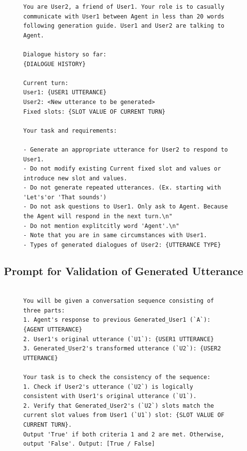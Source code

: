 \begin{figure}[h]
    \centering
\begin{lstlisting}
You are User2, a friend of User1. Your role is to casually communicate with User1 between Agent in less than 20 words following generation guide. User1 and User2 are talking to Agent.

Dialogue history so far:
{DIALOGUE HISTORY}

Current turn:
User1: {USER1 UTTERANCE}
User2: <New utterance to be generated>
Fixed slots: {SLOT VALUE OF CURRENT TURN}

Your task and requirements:

- Generate an appropriate utterance for User2 to respond to User1.
- Do not modify existing Current fixed slot and values or introduce new slot and values.
- Do not generate repeated utterances. (Ex. starting with 'Let's'or 'That sounds')
- Do not ask questions to User1. Only ask to Agent. Because the Agent will respond in the next turn.\n"
- Do not mention explitcitly word 'Agent'.\n"
- Note that you are in same circumstances with User1.
- Types of generated dialogues of User2: {UTTERANCE TYPE}

\end{lstlisting}
\end{figure}

\subsection{Prompt for Validation of Generated Utterance}
\label{app:prompt-validation}

\begin{figure}[h]
    \centering
\begin{lstlisting}

You will be given a conversation sequence consisting of three parts:
1. Agent's response to previous Generated_User1 (`A`): {AGENT UTTERANCE}
2. User1's original utterance (`U1`): {USER1 UTTERANCE}
3. Generated_User2's transformed utterance (`U2`): {USER2 UTTERANCE}

Your task is to check the consistency of the sequence:
1. Check if User2's utterance (`U2`) is logically consistent with User1's original utterance (`U1`).
2. Verify that Generated_User2's (`U2`) slots match the current slot values from User1 (`U1`) slot: {SLOT VALUE OF CURRENT TURN}.
Output 'True' if both criteria 1 and 2 are met. Otherwise, output 'False'. Output: [True / False]

\end{lstlisting}
\end{figure}

